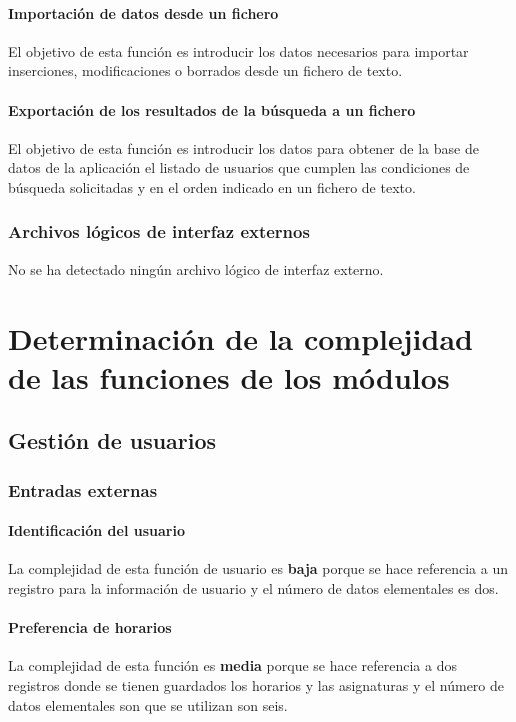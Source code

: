 \documentclass[11pt,a4paper,spanish,twoside]{book}
\begin{document}
\subsubsection{Importación de datos desde un fichero}
El objetivo de esta función es introducir los datos necesarios para importar 
inserciones, modificaciones o borrados desde un fichero de texto.

\subsubsection{Exportación de los resultados de la búsqueda a un fichero}
El objetivo de esta función es introducir los datos para obtener de la base
de datos de la aplicación el listado de usuarios que cumplen las condiciones de
búsqueda solicitadas y en el orden indicado en un fichero de texto.

\subsection{Archivos lógicos de interfaz externos}
No se ha detectado ningún archivo lógico de interfaz externo.

\chapter{Determinación de la complejidad de las funciones de los 
  módulos}
\section{Gestión de usuarios}
\subsection{Entradas externas}
\subsubsection{Identificación del usuario}
La complejidad de esta función de usuario es \textbf{baja} porque se hace
referencia a un registro para la información de usuario y el número de datos
elementales es dos. 

\subsubsection{Preferencia de horarios} 
La complejidad de esta función es \textbf{media} porque se hace
referencia a dos registros donde se tienen guardados los horarios y las
asignaturas y el número de datos elementales son que se utilizan son seis. 
\end{document}
